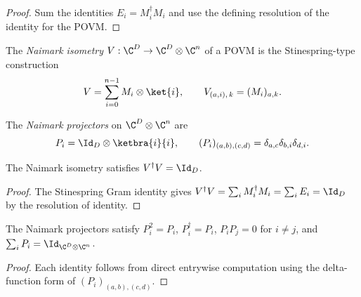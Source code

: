 \begin{proof}\leanok
    Sum the identities $E_i = M_i^\dagger M_i$ and use the defining
    resolution of the identity for the POVM.
\end{proof}

\begin{definition}\label{def:naimark_isometry}
    \leanok
    The \emph{Naimark isometry} $V : \C^D \to \C^D \otimes \C^n$ of a POVM
    is the Stinespring-type construction
    \[
        V = \sum_{i=0}^{n-1} M_i \otimes \ket{i},
        \qquad V_{(a,i),\,k} = (M_i)_{a,k}.
    \]
\end{definition}

\begin{definition}\label{def:naimark_projection}
    \leanok
    The \emph{Naimark projectors} on $\C^D \otimes \C^n$ are
    \[
        P_i = \Id_D \otimes \ketbra{i}{i},
        \qquad (P_i)_{(a,b),(c,d)} = \delta_{a,c} \delta_{b,i} \delta_{d,i}.
    \]
\end{definition}

\begin{theorem}\label{thm:naimark_isometry_isometry}
    \leanok
    The Naimark isometry satisfies $V^\dagger V = \Id_D$.
\end{theorem}

\begin{proof}
    \leanok
    The Stinespring Gram identity gives
    $V^\dagger V = \sum_i M_i^\dagger M_i = \sum_i E_i = \Id_D$
    by the resolution of identity.
\end{proof}

\begin{theorem}
    \label{thm:naimark_projection_axioms}
    \leanok
    The Naimark projectors satisfy $P_i^2 = P_i$, $P_i^\dagger = P_i$,
    $P_i P_j = 0$ for $i \ne j$, and $\sum_i P_i = \Id_{\C^D \otimes \C^n}$.
\end{theorem}

\begin{proof}
    \leanok
    Each identity follows from direct entrywise computation using the
    delta-function form of $(P_i)_{(a,b),(c,d)}$.
\end{proof}

